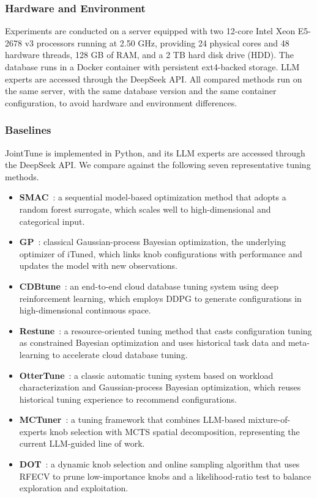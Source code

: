 \documentclass[runningheads]{llncs}
\begin{document}
\subsubsection{Hardware and Environment}\label{sec:hardware}

Experiments are conducted on a server equipped with two 12-core Intel
Xeon E5-2678 v3 processors running at 2.50 GHz, providing 24 physical
cores and 48 hardware threads, 128 GB of RAM, and a 2 TB hard disk drive
(HDD). The database runs in a Docker container with persistent
ext4-backed storage. LLM experts are accessed through the DeepSeek API.
All compared methods run on the same server, with the same database
version and the same container configuration, to avoid hardware and
environment differences.

\subsubsection{Baselines}\label{sec:baselines}

JointTune is implemented in Python, and its LLM experts are accessed
through the DeepSeek API. We compare against the following seven
representative tuning methods.

\begin{itemize}
  \item \textbf{SMAC}~\cite{smac}: a sequential model-based optimization
        method that adopts a random forest surrogate, which scales well to
        high-dimensional and categorical input.
  \item \textbf{GP}~\cite{ituned}: classical Gaussian-process Bayesian
        optimization, the underlying optimizer of iTuned, which links knob
        configurations with performance and updates the model with new
        observations.
  \item \textbf{CDBtune}~\cite{cdbtune}: an end-to-end cloud database
        tuning system using deep reinforcement learning, which employs DDPG
        to generate configurations in high-dimensional continuous space.
  \item \textbf{Restune}~\cite{restune}: a resource-oriented tuning method
        that casts configuration tuning as constrained Bayesian optimization
        and uses historical task data and meta-learning to accelerate cloud
        database tuning.
  \item \textbf{OtterTune}~\cite{ottertune}: a classic automatic tuning
        system based on workload characterization and Gaussian-process
        Bayesian optimization, which reuses historical tuning experience
        to recommend configurations.
  \item \textbf{MCTuner}~\cite{mctuner}: a tuning framework that combines
        LLM-based mixture-of-experts knob selection with MCTS spatial
        decomposition, representing the current LLM-guided line of work.
  \item \textbf{DOT}~\cite{dot}: a dynamic knob selection and online
        sampling algorithm that uses RFECV to prune low-importance knobs
        and a likelihood-ratio test to balance exploration and exploitation.
\end{itemize}
\end{document}
